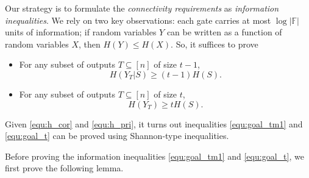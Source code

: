 \documentclass[11pt]{article}
\newcommand{\cond}{|}
\begin{document}
Our strategy is to formulate the \emph{connectivity requirements} as \emph{information inequalities}. We rely on two key observations: each gate carries at most $\log |\mathbb{F}|$ units of information; if random variables $Y$ can be written as a function of random variables $X$, then $H(Y) \le H(X)$.
So, it suffices to prove
\begin{itemize}
	\item For any subset of outputs $T \subseteq [n]$ of size $t-1$, 
	\begin{equation}
	\label{equ:goal_tm1}
		H(Y_T \cond S) \ge (t-1) H(S).
	\end{equation}
	\item For any subset of outputs $T \subseteq [n]$ of size $t$,
    \begin{equation}
    \label{equ:goal_t}
    	H(Y_T) \ge t H(S).
    \end{equation}
\end{itemize}
Given \eqref{equ:h_cor} and \eqref{equ:h_pri}, it turns out inequalities \eqref{equ:goal_tm1} and \eqref{equ:goal_t} can be proved using Shannon-type inequalities.
 
Before proving the information inequalities \eqref{equ:goal_tm1} and \eqref{equ:goal_t}, we first prove the following lemma.
 
\end{document}
